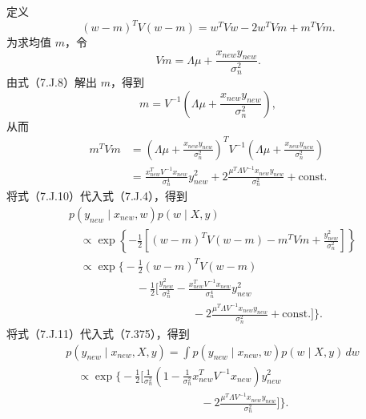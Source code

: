 定义
\begin{equation}
(w-m)^TV(w-m)=w^TVw-2w^TVm+m^TVm.\tag{7.J.7}
\end{equation}
为求均值 $m$，令
\begin{equation}
Vm=\Lambda\mu+\frac{x_{new}y_{new}}{\sigma_n^2}.\tag{7.J.8}
\end{equation}
由式（7.J.8）解出 $m$，得到
\begin{equation}
m=V^{-1}\left(\Lambda\mu+\frac{x_{new}y_{new}}{\sigma_n^2}\right),\tag{7.J.9}
\end{equation}
从而
\begin{equation}
\begin{aligned}
m^TVm
 &=\left(\Lambda\mu+\frac{x_{new}y_{new}}{\sigma_n^2}\right)^T
 V^{-1}\left(\Lambda\mu+\frac{x_{new}y_{new}}{\sigma_n^2}\right)\\
 &=\frac{x_{new}^TV^{-1}x_{new}}{\sigma_n^4}y_{new}^2
 +2\frac{\mu^T\Lambda V^{-1}x_{new}y_{new}}{\sigma_n^2}+\mathrm{const}.
\end{aligned}\tag{7.J.10}
\end{equation}
将式（7.J.10）代入式（7.J.4），得到
\begin{equation}
\begin{aligned}
&p(y_{new}\mid x_{new},w)p(w\mid X,y)\\
&\quad\propto\exp\left\{-\frac12\left[(w-m)^TV(w-m)-m^TVm
 +\frac{y_{new}^2}{\sigma_n^2}\right]\right\}\\
&\quad\propto\exp\biggl\{-\frac12(w-m)^TV(w-m)\\
&\hspace{6em}{}-\frac12\biggl[\frac{y_{new}^2}{\sigma_n^2}
 -\frac{x_{new}^TV^{-1}x_{new}}{\sigma_n^4}y_{new}^2\\
&\hspace{11em}{}-2\frac{\mu^T\Lambda V^{-1}x_{new}y_{new}}{\sigma_n^2}
 +\mathrm{const}.\biggr]\biggr\}.
\end{aligned}\tag{7.J.11}
\end{equation}
将式（7.J.11）代入式（7.375），得到
\begin{equation}
\begin{aligned}
&p(y_{new}\mid x_{new},X,y)
 =\int p(y_{new}\mid x_{new},w)p(w\mid X,y)\,dw\\
&\quad\propto\exp\biggl\{-\frac12\biggl[\frac1{\sigma_n^2}
 \left(1-\frac1{\sigma_n^2}x_{new}^TV^{-1}x_{new}\right)y_{new}^2\\
&\hspace{12em}{}-2\frac{\mu^T\Lambda V^{-1}x_{new}y_{new}}{\sigma_n^2}
 \biggr]\biggr\}.
\end{aligned}\tag{7.J.12}
\end{equation}

